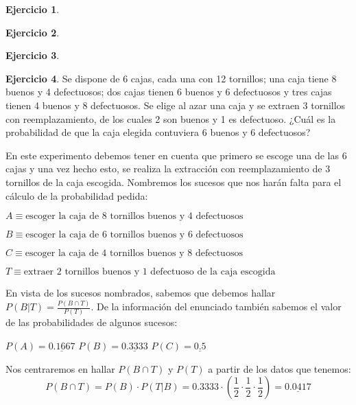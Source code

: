 \documentclass[a4paper, 12pt]{article}
\theoremstyle{definition}
\newtheorem{ej}{Ejercicio}
\begin{document}
\begin{ej}
\end{ej}

\begin{ej}
\end{ej}

\begin{ej}
\end{ej}

\begin{ej}
Se dispone de 6 cajas, cada una con 12 tornillos; una caja tiene 8 buenos y 4 defectuosos; dos
cajas tienen 6 buenos y 6 defectuosos y tres cajas tienen 4 buenos y 8 defectuosos. Se elige al
azar una caja y se extraen 3 tornillos con reemplazamiento, de los cuales 2 son buenos y 1 es
defectuoso. ¿Cuál es la probabilidad de que la caja elegida contuviera 6 buenos y 6 defectuosos?

\medskip

En este experimento debemos tener en cuenta que primero se escoge una de las 6 cajas y una vez hecho esto, se realiza la extracción con reemplazamiento de 3 tornillos de la caja escogida. Nombremos los sucesos que nos harán falta para el cálculo de la probabilidad pedida:

\begin{center}
    $A \equiv \text{escoger la caja de 8 tornillos buenos y 4 defectuosos}$
    
    $B \equiv \text{escoger la caja de 6 tornillos buenos y 6 defectuosos}$
    
    $C \equiv \text{escoger la caja de 4 tornillos buenos y 8 defectuosos}$
    
    $T \equiv \text{extraer 2 tornillos buenos y 1 defectuoso de la caja escogida}$
\end{center}

En vista de los sucesos nombrados, sabemos que debemos hallar $P(B|T) = \frac{P(B \cap T)}{P(T)}$. De la información del enunciado también sabemos el valor de las probabilidades de algunos sucesos:

\begin{center}
    $P(A) = \underline{0.1667}$ \hspace{1cm} $P(B) = \underline{0.3333}$ \hspace{1cm} $P(C) = \underline{0.5}$
\end{center}

Nos centraremos en hallar $P(B \cap T)$ y $P(T)$ a partir de los datos que tenemos:
\[
    P(B \cap T) = P(B) \cdot P(T|B) = 0.3333 \cdot \left(\frac{1}{2} \cdot \dfrac{1}{2} \cdot \frac{1}{2} \right) = \underline{0.0417} 
\]


\end{ej}
\end{document}

